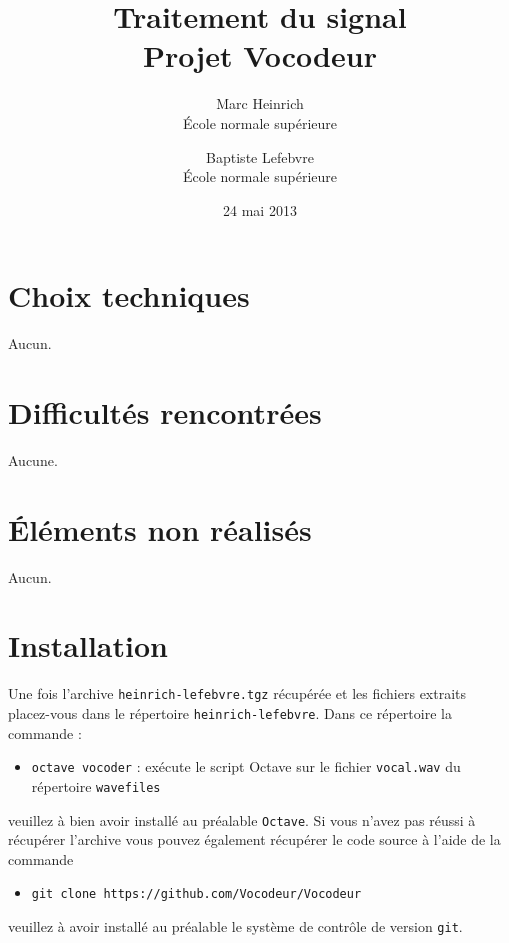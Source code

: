 \documentclass[a4paper]{article}
\begin{document}
	\title{\textbf{Traitement du signal \\ Projet Vocodeur}}
	\author{Marc Heinrich \\ \'Ecole normale supérieure \and Baptiste Lefebvre \\ \'Ecole normale supérieure}
	\date{24 mai 2013}
	\maketitle


\section{Choix techniques}
Aucun.

\section{Difficultés rencontrées}
Aucune.

\section{\'Eléments non réalisés}
Aucun.

\section{Installation}

Une fois l'archive \texttt{heinrich-lefebvre.tgz} récupérée et les fichiers extraits placez-vous dans le répertoire \texttt{heinrich-lefebvre}. Dans ce répertoire la commande :
\begin{itemize}
	\item \texttt{octave vocoder} : exécute le script Octave sur le fichier \texttt{vocal.wav} du répertoire \texttt{wavefiles}
\end{itemize}
veuillez à bien avoir installé au préalable \texttt{Octave}.
Si vous n'avez pas réussi à récupérer l'archive vous pouvez également récupérer le code source à l'aide de la commande
\begin{itemize}
	\item \texttt{git clone https://github.com/Vocodeur/Vocodeur}
\end{itemize}
veuillez à avoir installé au préalable le système de contrôle de version \texttt{git}.
 
\end{document}
